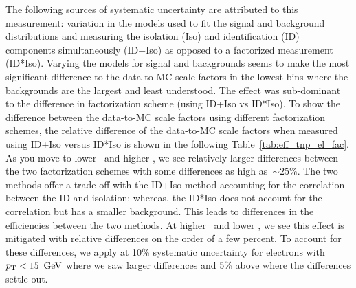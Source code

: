 
The following sources of systematic uncertainty are attributed to this
measurement: variation in the models used to fit the signal and background
distributions and measuring the isolation (Iso) and identification (ID)
components simultaneously (ID+Iso) as opposed to a factorized measurement
(ID*Iso). Varying the models for signal and backgrounds seems to make the
most significant difference to the data-to-MC scale factors in the lowest \pt
bins where the backgrounds are the largest and least understood. The effect
was sub-dominant to the difference in factorization scheme (using ID+Iso vs
ID*Iso). To show the difference between the data-to-MC scale factors using
different factorization schemes, the relative difference of the data-to-MC
scale factors when measured using ID+Iso versus ID*Iso is shown in the
following Table~\ref{tab:eff_tnp_el_fac}. As you move to lower \pt~and higher
\aeta, we see relatively larger differences between the two factorization
schemes with some differences as high as~$\sim 25\%$. The two methods offer a
trade off with the ID+Iso method accounting for the correlation between the
ID and isolation; whereas, the ID*Iso does not account for the correlation
but has a smaller background. This leads to differences in the efficiencies
between the two methods. At higher \pt~and lower \aeta, we see this effect is
mitigated with relative differences on the order of a few percent. To account
for these differences, we apply at 10\% systematic uncertainty for electrons
with $p_{\mathrm{T}}<15\ \,\text{Ge\hspace{-.08em}V}$ where we saw larger differences and 5\% above where the
differences settle out.
